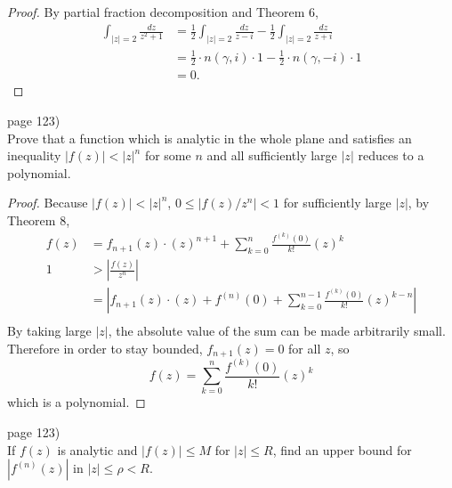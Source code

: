 \documentclass{article}
\newenvironment{problem}[2][Problem]{\begin{trivlist}
\item[\hskip \labelsep {\bfseries #1}\hskip \labelsep {\bfseries #2.}]}{\end{trivlist}}
\begin{document}
\begin{proof}
  By partial fraction decomposition and Theorem 6, \begin{align*}
    \int_{|z|=2}\frac{dz}{z^2 + 1} &= \frac{1}{2}\int_{|z|=2}\frac{dz}{z - i} -
    \frac{1}{2}\int_{|z|=2}\frac{dz}{z + i}\\
    &= \frac{1}{2}\cdot n(\gamma, i)\cdot 1 - \frac{1}{2}\cdot n(\gamma, -i)\cdot 1 \\
    &= 0.
  \end{align*}
\end{proof}

\pagebreak

\begin{problem}{2} (page 123) \\
  Prove that a function which is analytic in the whole plane and satisfies an
  inequality $|f(z)| < |z|^n$ for some $n$ and all sufficiently large $|z|$
  reduces to a polynomial.
\end{problem}

\begin{proof}
  Because $|f(z)| < |z|^n$, $0 \leq |f(z)/z^n| < 1$ for sufficiently large $|z|$,
  by Theorem 8, \begin{align*}
    f(z) &= f_{n+1}(z)\cdot(z)^{n+1} + \sum_{k = 0}^{n} \frac{f^{(k)}(0)}{k!}(z)^k \\
    1 &> \left|\frac{f(z)}{z^n}\right|\\
    &= \left|f_{n+1}(z)\cdot(z) + f^{(n)}(0) + \sum_{k = 0}^{n-1} \frac{f^{(k)}(0)}{k!}(z)^{k-n}\right| \\
  \end{align*}
  By taking large $|z|$, the absolute value of the sum can be made arbitrarily
  small. Therefore in order to stay bounded, $f_{n+1}(z) = 0$ for all $z$, so \[
    f(z) = \sum_{k = 0}^{n} \frac{f^{(k)}(0)}{k!}(z)^k
  \] which is a polynomial.
\end{proof}

\pagebreak

\begin{problem}{3} (page 123) \\
  If $f(z)$ is analytic and $|f(z)| \leq M$ for $|z| \leq R$, find an upper
  bound for $|f^{(n)}(z)|$ in $|z| \leq \rho < R$.
\end{problem}
\end{document}
